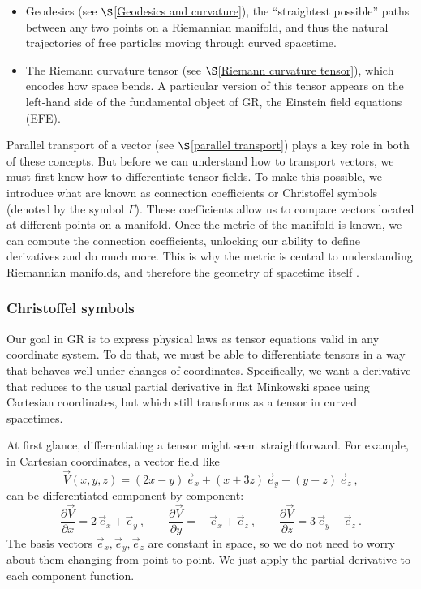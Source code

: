 \begin{itemize}
    \item Geodesics (see $\S$\ref{Geodesics and curvature}), the “straightest possible” paths between any two points on a Riemannian manifold, and thus the natural trajectories of free particles moving through curved spacetime.  
    \item The Riemann curvature tensor (see $\S$\ref{Riemann curvature tensor}), which encodes how space bends. A particular version of this tensor appears on the left-hand side of the fundamental object of GR, the Einstein field equations (EFE).
\end{itemize}

Parallel transport of a vector (see $\S$\ref{parallel transport}) plays a key role in both of these concepts. But before we can understand how to transport vectors, we must first know how to differentiate tensor fields. To make this possible, we introduce what are known as connection coefficients or Christoffel symbols (denoted by the symbol $\Gamma$). These coefficients allow us to compare vectors located at different points on a manifold. Once the metric of the manifold is known, we can compute the connection coefficients, unlocking our ability to define derivatives and do much more. This is why the metric is central to understanding Riemannian manifolds, and therefore the geometry of spacetime itself \cite{Llibre_Peter_Collier_unacosadificildecomprender}.


\subsubsection{Christoffel symbols}

Our goal in GR is to express physical laws as tensor equations valid in any coordinate system. To do that, we must be able to differentiate tensors in a way that behaves well under changes of coordinates. Specifically, we want a derivative that reduces to the usual partial derivative in flat Minkowski space using Cartesian coordinates, but which still transforms as a tensor in curved spacetimes.

At first glance, differentiating a tensor might seem straightforward. For example, in Cartesian coordinates, a vector field like
\begin{equation}
\vec{V}(x, y, z) = (2x - y)\, \vec{e}_x + (x + 3z)\, \vec{e}_y + (y - z)\, \vec{e}_z \ ,
\end{equation}
can be differentiated component by component: 
\begin{equation}
\frac{\partial \vec{V}}{\partial x} = 2\, \vec{e}_x + \vec{e}_y \ , \quad \quad 
\frac{\partial \vec{V}}{\partial y} = -\, \vec{e}_x + \vec{e}_z \ , \quad \quad
\frac{\partial \vec{V}}{\partial z} = 3\, \vec{e}_y - \vec{e}_z \ .
\end{equation}
The basis vectors $\vec{e}_x, \vec{e}_y, \vec{e}_z$ are constant in space, so we do not need to worry about them changing from point to point. We just apply the partial derivative to each component function.

